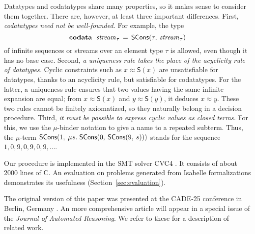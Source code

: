 \documentclass[letter]{article}
\newcommand\MU{\vvthinspace\mu\vvthinspace}
\theoremstyle{plain}
\theoremstyle{definition}
\newcommand\cpp{C\nobreak\raisebox{.05ex}{+}\nobreak\raisebox{.05ex}{+}}
\newcommand\keyw[1]{\textbf{#1}}
\newcommand\const[1]{\textsf{#1}}
\newcommand\ty[1]{\textit{#1}}
\newcommand{\teq}{\approx}
\newcommand\vvthinspace{\kern+0.041667em}
\newcommand\vthinspace{\kern+0.083333em}
\begin{document}
Datatypes and codatatypes share many properties, so it makes sense
to consider them together. There are, however, at least three important
differences.
%
First, \emph{codatatypes need not be well-founded.}
For example, the type
$$\vthinspace\keyw{codata}~\;\ty{stream}_{\vthinspace\tau} \,=\allowbreak\, \const{SCons}(\tau,\allowbreak\: \ty{stream}_{\vthinspace\tau})\vthinspace$$
of infinite sequences or streams over an element type $\tau$ is
allowed, even though it has no base case.
Second, \emph{a uniqueness rule takes the place of the acyclicity rule of datatypes.}
Cyclic constraints such as
$x \teq \const{S}(x)$ %
are unsatisfiable for datatypes,
thanks to an acyclicity rule,
but satisfiable for codatatypes. 
For the latter, a uniqueness rule ensures that two values
having the same infinite expansion are equal; from $x
\teq \const{S}(x)$ and
$y \teq \const{S}(y)$, it deduces $x \teq y$.
These two rules cannot be finitely axiomatized, so they naturally belong in
a decision procedure.
%
Third, \emph{it must be possible to express cyclic values as closed terms.} %
For this, we use the \hbox{$\mu$-binder} notation to give a name to
a repeated subterm. Thus,
the $\mu$-term $\const{SCons}(1,\:\allowbreak \MU s.\; \const{SCons}(0,\:\allowbreak \const{SCons}(9,\: s)))$
stands for the %
sequence $1, 0, 9, 0, 9, 0, 9, \dotsc$.


Our procedure is implemented in the SMT solver CVC4 \cite{barrett-et-al-2011}. 
It consists of about 2000 lines of \cpp{}. %
%
An evaluation on %
problems generated from Isabelle
formalizations demonstrates its usefulness (Section~\ref{sec:evaluation}).

The original version of this paper was presented at the CADE-25 conference in
Berlin, Germany \cite{reynolds-blanchette-2015-codata}. An more comprehensive
article %
will appear in a special issue of the
\emph{Journal of Automated Reasoning}. We refer to these for a description of
related work.
\end{document}
